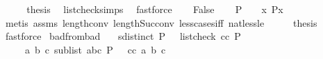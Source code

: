 \begin{isabellebody}
\ \ \isamarkupfalse%
\ \isamarkupfalse%
\ {\isacharquery}{\kern0pt}thesis\ \isamarkupfalse%
\ list{\isacharunderscore}{\kern0pt}check{\isachardot}{\kern0pt}simps{\isacharparenleft}{\kern0pt}{}{\isacharparenright}{\kern0pt}\ \isamarkupfalse%
\ fastforce\isanewline
{}\isamarkupfalse%
\isanewline
\ \ \isamarkupfalse%
\ False\isanewline
\ \ \isamarkupfalse%
\ {\isachardoublequoteopen}{\isacharparenleft}{\kern0pt}P\ {\isacharequal}{\kern0pt}\ {\isacharbrackleft}{\kern0pt}{\isacharbrackright}{\kern0pt}{\isacharparenright}{\kern0pt}\ {\isasymor}\ {\isacharparenleft}{\kern0pt}{\isasymexists}x{\isachardot}{\kern0pt}\ P{\isacharequal}{\kern0pt}{\isacharbrackleft}{\kern0pt}x{\isacharbrackright}{\kern0pt}{\isacharparenright}{\kern0pt}{\isachardoublequoteclose}\isanewline
\ \ \ \ \isamarkupfalse%
\ {\isacharparenleft}{\kern0pt}metis\ assms{\isacharparenleft}{\kern0pt}{}{\isacharparenright}{\kern0pt}\ length{\isacharunderscore}{\kern0pt}{}{\isacharunderscore}{\kern0pt}conv\ length{\isacharunderscore}{\kern0pt}Suc{\isacharunderscore}{\kern0pt}conv\ less{\isacharunderscore}{\kern0pt}{}{\isacharunderscore}{\kern0pt}cases{\isacharunderscore}{\kern0pt}iff\ nat{\isacharunderscore}{\kern0pt}less{\isacharunderscore}{\kern0pt}le{\isacharparenright}{\kern0pt}\isanewline
\ \ \isamarkupfalse%
\ \isamarkupfalse%
\ {\isacharquery}{\kern0pt}thesis\ \isamarkupfalse%
\ fastforce\isanewline
{}\isamarkupfalse%
%
\endisatagproof
{\isafoldproof}%
%
\isadelimproof
\isanewline
%
\endisadelimproof
\isanewline
{}\isamarkupfalse%
\ bad{}{\isacharunderscore}{\kern0pt}from{\isacharunderscore}{\kern0pt}bad{\isacharcolon}{\kern0pt}\isanewline
\ \ \ {\isachardoublequoteopen}sdistinct\ P{\isachardoublequoteclose}\ \ {\isachardoublequoteopen}{\isasymnot}\ list{\isacharunderscore}{\kern0pt}check\ cc\ P{\isachardoublequoteclose}\isanewline
\ \ \ \ \ {\isachardoublequoteopen}{\isasymexists}a\ b\ c{\isachardot}{\kern0pt}\ {\isacharparenleft}{\kern0pt}sublist\ {\isacharbrackleft}{\kern0pt}a{\isacharcomma}{\kern0pt}b{\isacharcomma}{\kern0pt}c{\isacharbrackright}{\kern0pt}\ P{\isacharparenright}{\kern0pt}\ {\isasymand}\ {\isasymnot}\ cc\ a\ b\ c{\isachardoublequoteclose}\isanewline
%
\isadelimproof
\ \ %
\endisadelimproof
%
\isatagproof

\end{isabellebody}
